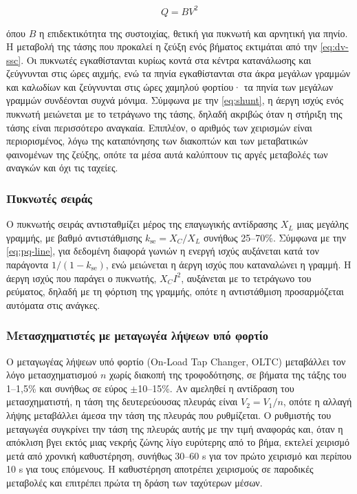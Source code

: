\begin{equation}
Q = B V^2
\label{eq:shunt}
\end{equation}

όπου $B$ η επιδεκτικότητα της συστοιχίας, θετική για πυκνωτή και αρνητική για πηνίο. Η
μεταβολή της τάσης που προκαλεί η ζεύξη ενός βήματος εκτιμάται από την \eqref{eq:dv-ssc}. Οι
πυκνωτές εγκαθίστανται κυρίως κοντά στα κέντρα κατανάλωσης και ζεύγνυνται στις ώρες αιχμής,
ενώ τα πηνία εγκαθίστανται στα άκρα μεγάλων γραμμών και καλωδίων και ζεύγνυνται στις ώρες
χαμηλού φορτίου· τα πηνία των μεγάλων γραμμών συνδέονται συχνά μόνιμα. Σύμφωνα με την
\eqref{eq:shunt}, η άεργη ισχύς ενός πυκνωτή μειώνεται με το τετράγωνο της τάσης, δηλαδή
ακριβώς όταν η στήριξη της τάσης είναι περισσότερο αναγκαία. Επιπλέον, ο αριθμός των χειρισμών
είναι περιορισμένος, λόγω της καταπόνησης των διακοπτών και των μεταβατικών φαινομένων της
ζεύξης, οπότε τα μέσα αυτά καλύπτουν τις αργές μεταβολές των αναγκών και όχι τις ταχείες.

\subsubsection{Πυκνωτές σειράς}

Ο πυκνωτής σειράς αντισταθμίζει μέρος της επαγωγικής αντίδρασης $X_L$ μιας μεγάλης γραμμής,
με βαθμό αντιστάθμισης $k_{\mathrm{se}} = X_C / X_L$ συνήθως 25--70\%. Σύμφωνα με την
\eqref{eq:pq-line}, για δεδομένη διαφορά γωνιών η ενεργή ισχύς αυξάνεται κατά τον παράγοντα
$1/(1 - k_{\mathrm{se}})$, ενώ μειώνεται η άεργη ισχύς που καταναλώνει η γραμμή. Η άεργη
ισχύς που παράγει ο πυκνωτής, $X_C I^2$, αυξάνεται με το τετράγωνο του ρεύματος, δηλαδή με τη
φόρτιση της γραμμής, οπότε η αντιστάθμιση προσαρμόζεται αυτόματα στις ανάγκες.

\subsubsection{Μετασχηματιστές με μεταγωγέα λήψεων υπό φορτίο}
\label{sec:oltc}

Ο μεταγωγέας λήψεων υπό φορτίο (On-Load Tap Changer, OLTC) μεταβάλλει τον λόγο
μετασχηματισμού $n$ χωρίς διακοπή της τροφοδότησης, σε βήματα της τάξης του 1--1,5\% και
συνήθως σε εύρος $\pm$10--15\%. Αν αμεληθεί η αντίδραση του μετασχηματιστή, η τάση της
δευτερεύουσας πλευράς είναι $V_2 = V_1/n$, οπότε η αλλαγή λήψης μεταβάλλει άμεσα την τάση
της πλευράς που ρυθμίζεται. Ο ρυθμιστής του μεταγωγέα συγκρίνει την τάση της πλευράς αυτής με
την τιμή αναφοράς και, όταν η απόκλιση βγει εκτός μιας νεκρής ζώνης λίγο ευρύτερης από το
βήμα, εκτελεί χειρισμό μετά από χρονική καθυστέρηση, συνήθως 30--60 s για τον πρώτο χειρισμό
και περίπου 10 s για τους επόμενους. Η καθυστέρηση αποτρέπει χειρισμούς σε παροδικές
μεταβολές και επιτρέπει πρώτα τη δράση των ταχύτερων μέσων.

